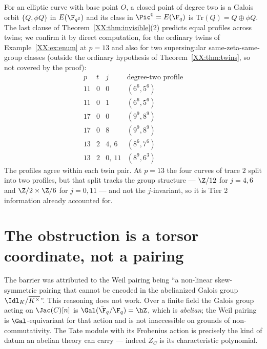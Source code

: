 \begin{remark}\label{XX:rem:numcheck}
For an elliptic curve with base point $O$, a closed point of degree two is a Galois orbit
$\{Q,\phi Q\}$ in $E(\F_{q^2})$ and its class in $\Pic^0=E(\F_q)$ is $\mathrm{Tr}(Q)=Q\oplus\phi Q$.
The last clause of Theorem~\ref{XX:thm:invisible}(2) predicts equal profiles across twins; we
confirm it by direct computation, for the ordinary twins of Example~\ref{XX:ex:enum} at $p=13$
and also for two supersingular same-zeta-same-group classes (outside the ordinary hypothesis
of Theorem~\ref{XX:thm:twins}, so not covered by the proof):
\[
\begin{array}{llll}
p & t & j & \text{degree-two profile}\\\hline
11 & 0 & 0 & (6^6,5^6)\\
11 & 0 & 1 & (6^6,5^6)\\
17 & 0 & 0 & (9^9,8^9)\\
17 & 0 & 8 & (9^9,8^9)\\
13 & 2 & 4,\ 6 & (8^6,7^6)\\
13 & 2 & 0,\ 11 & (8^9,6^3)
\end{array}
\]
The profiles agree within each twin pair. At $p=13$ the four curves of trace $2$ split into
two profiles, but that split tracks the group structure --- $\Z/12$ for $j=4,6$ and
$\Z/2\times\Z/6$ for $j=0,11$ --- and not the $j$-invariant, so it is Tier 2 information
already accounted for.
\end{remark}

\section{The obstruction is a torsor coordinate, not a pairing}

\begin{remark}\label{XX:rem:pairing}
The barrier was attributed to the Weil pairing being ``a non-linear skew-symmetric pairing
that cannot be encoded in the abelianized Galois group $\Idl_K/\overline{K^\times}$''. This
reasoning does not work. Over a finite field the Galois group acting on $\Jac(C)[n]$ is
$\Gal(\bar\F_q/\F_q)=\hZ$, which is \emph{abelian}; the Weil pairing is
$\Gal$-equivariant for that action and is not inaccessible on grounds of non-commutativity.
The Tate module with its Frobenius action is precisely the kind of datum an abelian theory
can carry --- indeed $Z_C$ is its characteristic polynomial.
\end{remark}

